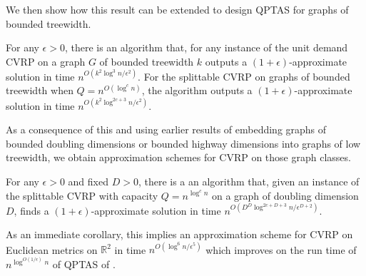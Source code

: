 \documentclass[twoside,leqno]{article}
\newcommand{\eps}{\epsilon}
\begin{document}


We then show how this result can be extended to design QPTAS for graphs of bounded treewidth.

\begin{theorem}\label{thm:treewidth}
For any $\eps > 0$, there is an algorithm that, for any instance of the unit demand CVRP on a graph $G$ of bounded treewidth $k$ outputs a $(1+\eps)$-approximate solution in time
$n^{O(k^2\log^3 n/\eps^2)}$. For the splittable CVRP on graphs of bounded treewidth when $Q = n^{O(\log^c n)}$,
the algorithm outputs a $(1 + \eps)$-approximate solution in time $n^{O(k^2\log^{2c + 3} n/\eps^2)}$.
\end{theorem}



As a consequence of this and using earlier results of embedding graphs of bounded doubling dimensions or bounded highway dimensions into graphs of low treewidth, we obtain approximation schemes for CVRP on those graph classes.

\begin{theorem}\label{thm:DD}
For any $\eps > 0$ and fixed $D > 0$, there is a an algorithm that, given an instance of the splittable CVRP with
capacity $Q = n^{\log^c n}$ on a graph of doubling dimension $D$, finds a $(1 + \eps)$-approximate solution in time $n^{O(D^D \log^{2c + D + 3}n/\eps^{D+2})}$.
\end{theorem}

As an immediate corollary, this implies an approximation scheme for CVRP on Euclidean metrics on $\mathbb{R}^2$ in time $n^{O(\log^{6}n/\eps^{5})}$
which improves on the run time of $n^{\log^{O(1/\epsilon)}n}$ of QPTAS of \cite{Das-Mathieu}.
\end{document}
